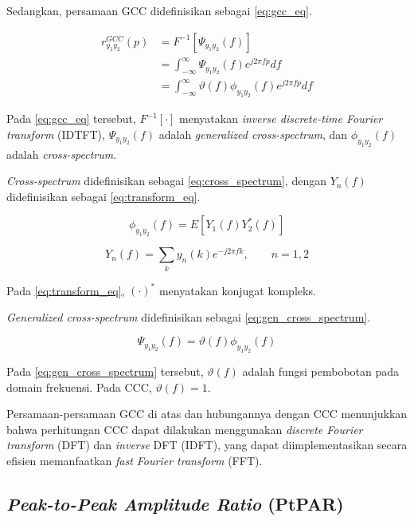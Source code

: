 Sedangkan, persamaan GCC didefinisikan sebagai \autoref{eq:gcc_eq}.

\begin{align}\label{eq:gcc_eq}
r^{GCC}_{y_{1} y_{2}} (p) &= F^{-1} [ \Psi_{y_{1} y_{2}} (f) ] \nonumber \\
& = \int_{-\infty}^\infty \Psi_{y_{1} y_{2}} (f) e^{j 2 \pi f p} df \nonumber \\
& = \int_{-\infty}^\infty \vartheta (f) \phi_{y_{1} y_{2}} (f) e^{j 2 \pi f p} df
\end{align}

Pada \autoref{eq:gcc_eq} tersebut, $F^{-1} [ \cdot ]$ menyatakan \textit{inverse discrete-time Fourier transform} (IDTFT), $\Psi_{y_{1} y_{2}} (f)$ adalah \textit{generalized cross-spectrum}, dan $\phi_{y_{1} y_{2}} (f)$ adalah \textit{cross-spectrum}.

\textit{Cross-spectrum} didefinisikan sebagai \autoref{eq:cross_spectrum}, dengan $Y_n (f)$ didefinisikan sebagai \autoref{eq:transform_eq}.

\begin{equation}\label{eq:cross_spectrum}
\phi_{y_{1} y_{2}} (f) = E [ Y_1 (f) Y^*_2 (f) ]
\end{equation}

\begin{equation}\label{eq:transform_eq}
Y_n (f) = \sum_k y_n (k) e^{-j 2 \pi f k}, \qquad n = 1, 2
\end{equation}

Pada \autoref{eq:transform_eq}, $( \cdot )^*$ menyatakan konjugat kompleks.

\textit{Generalized cross-spectrum} didefinisikan sebagai \autoref{eq:gen_cross_spectrum}.

\begin{equation}\label{eq:gen_cross_spectrum}
\Psi_{y_{1} y_{2}} (f) = \vartheta (f) \phi_{y_{1} y_{2}} (f)
\end{equation}

Pada \autoref{eq:gen_cross_spectrum} tersebut, $\vartheta (f)$ adalah fungsi pembobotan pada domain frekuensi. Pada CCC, $\vartheta (f) = 1$.

Persamaan-persamaan GCC di atas dan hubungannya dengan CCC menunjukkan bahwa perhitungan CCC dapat dilakukan menggunakan \textit{discrete Fourier transform} (DFT) dan \textit{inverse} DFT (IDFT), yang dapat diimplementasikan secara efisien memanfaatkan \textit{fast Fourier transform} (FFT).


\subsection{\textit{Peak-to-Peak Amplitude Ratio} (PtPAR)}
\label{subsec:amplitude_ratio}

